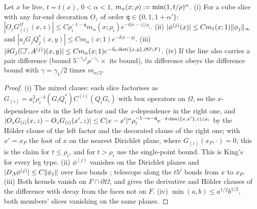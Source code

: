 \begin{lemma}\label{lem:a02:H}
Let $x$ be live, $t=t(x)$, $0<\alpha<1$, $m_\alpha(x;\rho):=\min(1,t/\rho)^\alpha$. (i) For a cube slice with any far-end decoration $O_z$ of order $\mathsf q\in\{0,1,1+\alpha'\}$: $|O_zG^\Omega_{(i)}(x,z)|\le C\rho_i^{-1-\mathsf q}m_\alpha(x;\rho_i)e^{-\delta|x-z|/\rho_i}$. (ii) $|\phi^{(j)}(x)|\le Cm_1(x;1)\lVert \phi_j\rVert_\infty$ and $|a_jG_jQ_j^*(x,y)|\le Cm_\alpha(x;1)e^{-\delta|x-y|}$. (iii) $|\delta G_j(\square',A^{(j)})(x,y)|\le Cm_\alpha(x;1)e^{-\delta_0\operatorname{dist}(\{x,y\},\partial\Omega\setminus F)}$. (iv) If the line also carries a pair difference (bound $5^{-\gamma_1j}\rho^{-\gamma_1}\times$ its bound), its difference obeys the difference bound with $\gamma=\gamma_1/2$ times $m_{\alpha/2}$.
\end{lemma}
\begin{proof}
(i) The mixed clause: each slice factorises as $G_{(i)}=a_i^2\rho_i^{-4}(G_iQ_i^*)C^{(i)}(Q_iG_i)$ \cite[(2.17), (3.60)]{K1} with box operators on $\Omega$, so the $x$-dependence sits in the left factor and the $z$-dependence in the right one, and $|O_zG_{(i)}(x,z)-O_zG_{(i)}(x',z)|\le C|x-x'|^\alpha\rho_i^{-1-\alpha-\mathsf q}e^{-\delta\operatorname{dist}(\{x,x'\},z)/\rho_i}$ by the H\"older clause of the left factor and the decorated clause of the right one; with $x'=x_P$ the foot of $x$ on the nearest Dirichlet plane, where $G_{(i)}(x_P,\cdot)=0$, this is the claim for $t\le\rho_i$, and for $t>\rho_i$ use the single-point bound. This is King's \cite[(3.19)]{K2} for every leg type. (ii) $\phi^{(j)}$ vanishes on the Dirichlet planes and $|D_A\phi^{(j)}|\le C\lVert \phi_j\rVert$ over face bonds \cite[(5.2)]{K2}; telescope along the $t5^{j}$ bonds from $x$ to $x_P$. (iii) Both kernels vanish on $F\cap\partial\Omega$, and \cite[(5.3)]{K2} gives the derivative and H\"older clauses of the difference with decay from the faces not on $F$. (iv) $\min(a,b)\le a^{1/2}b^{1/2}$, both members' slices vanishing on the same planes.
\end{proof}

